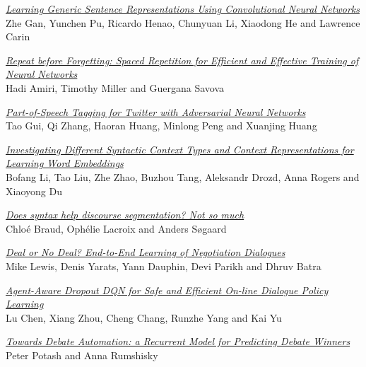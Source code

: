 \hyperlink{page.2373}{\em Learning Generic Sentence Representations Using Convolutional Neural Networks}\samepage \\
\hspace*{7mm} Zhe Gan, Yunchen Pu, Ricardo Henao, Chunyuan Li, Xiaodong He and Lawrence Carin\dotfill {}

\hyperlink{page.2384}{\em Repeat before Forgetting: Spaced Repetition for Efficient and Effective Training of Neural Networks}\samepage \\
\hspace*{7mm} Hadi Amiri, Timothy Miller and Guergana Savova\dotfill {}

\hyperlink{page.2394}{\em Part-of-Speech Tagging for Twitter with Adversarial Neural Networks}\samepage \\
\hspace*{7mm} Tao Gui, Qi Zhang, Haoran Huang, Minlong Peng and Xuanjing Huang\dotfill {}

\hyperlink{page.2404}{\em Investigating Different Syntactic Context Types and Context Representations for Learning Word Embeddings}\samepage \\
\hspace*{7mm} Bofang Li, Tao Liu, Zhe Zhao, Buzhou Tang, Aleksandr Drozd, Anna Rogers and Xiaoyong Du\dotfill {}

\hyperlink{page.2415}{\em Does syntax help discourse segmentation? Not so much}\samepage \\
\hspace*{7mm} Chlo\'{e} Braud, Oph\'{e}lie Lacroix and Anders S{\o}gaard\dotfill {}

\hyperlink{page.2426}{\em Deal or No Deal? End-to-End Learning of Negotiation Dialogues}\samepage \\
\hspace*{7mm} Mike Lewis, Denis Yarats, Yann Dauphin, Devi Parikh and Dhruv Batra\dotfill {}

\hyperlink{page.2437}{\em Agent-Aware Dropout DQN for Safe and Efficient On-line Dialogue Policy Learning}\samepage \\
\hspace*{7mm} Lu Chen, Xiang Zhou, Cheng Chang, Runzhe Yang and Kai Yu\dotfill {}

\hyperlink{page.2448}{\em Towards Debate Automation: a Recurrent Model for Predicting Debate Winners}\samepage \\
\hspace*{7mm} Peter Potash and Anna Rumshisky\dotfill {}

